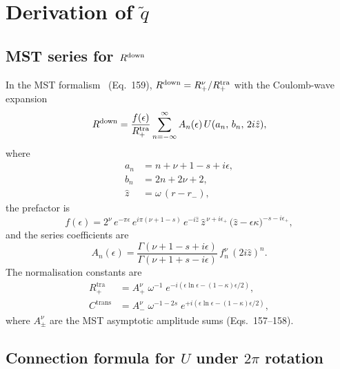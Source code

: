 \documentclass[12pt,a4paper]{article}
\begin{document}
\appendix
\section{Derivation of $\tilde{q}$}
\subsection{MST series for \texorpdfstring{$R^{\rm down}$}{Rdown}}

In the MST formalism~\cite{SasakiTagoshi2003} (Eq.~159),
$R^{\rm down} = R^\nu_+ / R^{\mathrm{tra}}_+$ with the
Coulomb-wave expansion
\begin{equation}
  R^{\rm down}
  = \frac{f(\epsilon)}{R^{\mathrm{tra}}_+}
    \sum_{n=-\infty}^{\infty} A_n(\epsilon)\,
    U(a_n,\,b_n,\,2i\hat{z}),
  \label{eq:Rdown_MST}
\end{equation}
where
\begin{align}
  a_n &= n + \nu + 1 - s + i\epsilon, \label{eq:an}\\
  b_n &= 2n + 2\nu + 2, \label{eq:bn}\\
  \hat{z} &= \omega\,(r - r_-), \label{eq:zhat}
\end{align}
the prefactor is
\begin{equation}
  f(\epsilon) = 2^{\nu}\,e^{-\pi\epsilon}\,e^{i\pi(\nu+1-s)}\,
    e^{-i\hat{z}}\,\hat{z}^{\,\nu+i\epsilon_{+}}\,
    \bigl(\hat{z} - \epsilon\kappa\bigr)^{-s-i\epsilon_{+}},
  \label{eq:feps}
\end{equation}
and the series coefficients are
\begin{equation}
  A_n(\epsilon) = \frac{\Gamma(\nu+1-s+i\epsilon)}
    {\Gamma(\nu+1+s-i\epsilon)}\,f_n^\nu\,(2i\hat{z})^n.
  \label{eq:An}
\end{equation}
The normalisation constants are
\begin{align}
  R^{\mathrm{tra}}_+ &= A^\nu_+\;\omega^{-1}\;
    e^{-i(\epsilon\ln\epsilon - (1-\kappa)\epsilon/2)},
  \label{eq:Rtrans}\\
  C^{\mathrm{trans}} &= A^\nu_-\;\omega^{-1-2s}\;
    e^{+i(\epsilon\ln\epsilon - (1-\kappa)\epsilon/2)},
  \label{eq:Ctrans}
\end{align}
where $A^\nu_\pm$ are the MST asymptotic amplitude sums
\cite{SasakiTagoshi2003} (Eqs.~157--158).

\subsection{Connection formula for $U$ under \texorpdfstring{$2\pi$}{2pi} rotation}
\end{document}
